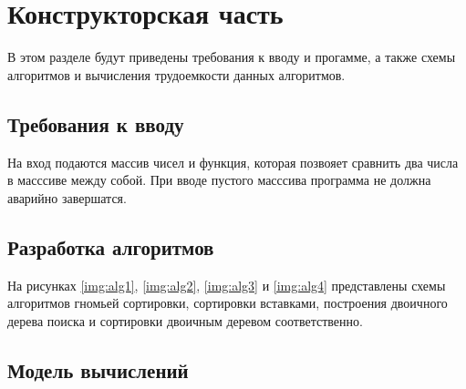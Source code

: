 \chapter{Конструкторская часть}
В этом разделе будут приведены требования к вводу и прогамме, а также схемы алгоритмов и вычисления трудоемкости данных алгоритмов.

\section{Требования к вводу}
На вход подаются массив чисел и функция, которая позвояет сравнить два числа в масссиве между собой. При вводе пустого масссива программа не должна аварийно завершатся.

\section{Разработка алгоритмов}

На рисунках \ref{img:alg1}, \ref{img:alg2}, \ref{img:alg3} и \ref{img:alg4} представлены схемы алгоритмов гномьей сортировки, сортировки вставками, построения двоичного дерева поиска и сортировки двоичным деревом соответственно.

\newpage
{}

\newpage
{}

\newpage
{}

\newpage
{}

\section{Модель вычислений}

